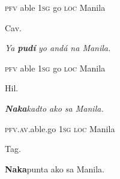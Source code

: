 \begin{stylelsIMT}
\textsc{pfv} able \textsc{1sg} go \textsc{loc} Manila
\end{stylelsIMT}

\begin{listWWNumiileveli}
\item 
\begin{listWWNumiilevelii}
\item 
\begin{stylelsLanginfo}
Cav.
\end{stylelsLanginfo}
\end{listWWNumiilevelii}
\end{listWWNumiileveli}
\begin{stylelsIMT}
\textit{Ya }\textbf{\textit{pudí}}\textit{ yo andá na Manila.} 
\end{stylelsIMT}

\begin{stylelsIMT}
\textsc{pfv} able \textsc{1sg} go \textsc{loc} Manila
\end{stylelsIMT}

\begin{listWWNumiileveli}
\item 
\begin{listWWNumiilevelii}
\item 
\begin{stylelsLanginfo}
Hil.
\end{stylelsLanginfo}
\end{listWWNumiilevelii}
\end{listWWNumiileveli}
\begin{stylelsIMT}
\textbf{\textit{Naka}}\textit{kadto ako sa Manila.}
\end{stylelsIMT}

\begin{stylelsIMT}
\textsc{pfv}.\textsc{av}.able.go \textsc{1sg} \textsc{loc} Manila
\end{stylelsIMT}

\begin{listWWNumiileveli}
\item 
\begin{listWWNumiilevelii}
\item 
\begin{stylelsLanginfo}
Tag.
\end{stylelsLanginfo}
\end{listWWNumiilevelii}
\end{listWWNumiileveli}
\begin{stylelsSourceline}
\textbf{Naka}punta ako sa Manila.
\end{stylelsSourceline}

